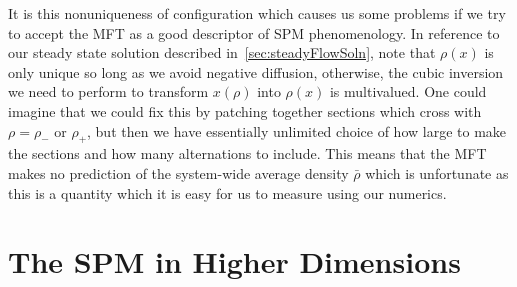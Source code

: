 It is this nonuniqueness of configuration which causes us some problems if we try to accept the MFT as a good descriptor of SPM phenomenology. In reference to our steady state solution described in~\ref{sec:steadyFlowSoln},
note that $\rho(x)$ is only unique so long as we avoid negative diffusion, otherwise, the cubic inversion we need to perform to transform $x(\rho)$ into $\rho(x)$ is multivalued. One could imagine that we could fix this
by patching together sections which cross with $\rho=\rho_-$ or $\rho_+$, but then we have essentially unlimited choice of how large to make the sections and how many alternations to include. This means that the MFT makes no
prediction of the system-wide average density $\bar{\rho}$
which is unfortunate as this is a quantity which it is easy for us to measure using our numerics.


\section{The SPM in Higher Dimensions}

